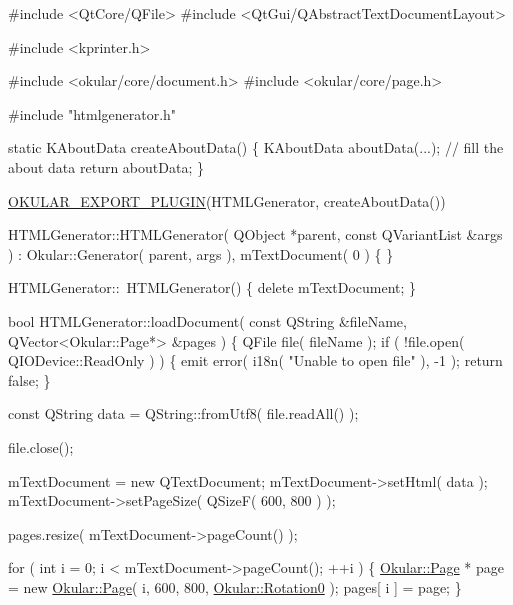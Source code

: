 \begin{DoxyCode}
\textcolor{preprocessor}{#include <QtCore/QFile>}
\textcolor{preprocessor}{#include <QtGui/QAbstractTextDocumentLayout>}

\textcolor{preprocessor}{#include <kprinter.h>}

\textcolor{preprocessor}{#include <okular/core/document.h>}
\textcolor{preprocessor}{#include <okular/core/page.h>}

\textcolor{preprocessor}{#include "htmlgenerator.h"}

\textcolor{keyword}{static} KAboutData createAboutData()
\{
    KAboutData aboutData(...);
    \textcolor{comment}{// fill the about data}
    \textcolor{keywordflow}{return} aboutData;
\}

\hyperlink{generator_8h_a87d954a3809f78e33fb1cb8e2369a05c}{OKULAR\_EXPORT\_PLUGIN}(HTMLGenerator, createAboutData())

HTMLGenerator::HTMLGenerator( QObject *parent, const QVariantList &args )
    : Okular::Generator( parent, args ),
      mTextDocument( 0 )
\{
\}

HTMLGenerator::~HTMLGenerator()
\{
    \textcolor{keyword}{delete} mTextDocument;
\}

\textcolor{keywordtype}{bool} HTMLGenerator::loadDocument( \textcolor{keyword}{const} QString &fileName, QVector<Okular::Page*> &pages )
\{
    QFile file( fileName );
    \textcolor{keywordflow}{if} ( !file.open( QIODevice::ReadOnly ) ) \{
        emit error( i18n( \textcolor{stringliteral}{"Unable to open file"} ), -1 );
        \textcolor{keywordflow}{return} \textcolor{keyword}{false};
    \}

    \textcolor{keyword}{const} QString data = QString::fromUtf8( file.readAll() );

    file.close();

    mTextDocument = \textcolor{keyword}{new} QTextDocument;
    mTextDocument->setHtml( data );
    mTextDocument->setPageSize( QSizeF( 600, 800 ) );

    pages.resize( mTextDocument->pageCount() );

    \textcolor{keywordflow}{for} ( \textcolor{keywordtype}{int} i = 0; i < mTextDocument->pageCount(); ++i ) \{
      \hyperlink{classOkular_1_1Page}{Okular::Page} * page = \textcolor{keyword}{new} \hyperlink{classOkular_1_1Page}{Okular::Page}( i, 600, 800, 
      \hyperlink{namespaceOkular_a8556d00465f61ef533c6b027669e7da6aa4df8fc3dd09e30520c264c8d23d89c2}{Okular::Rotation0} );
      pages[ i ] = page;
    \}


\end{DoxyCode}
